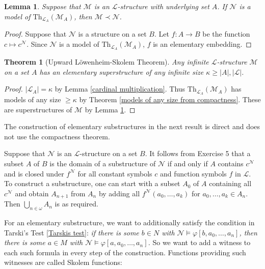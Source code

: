 \documentclass[a4paper, 11pt]{amsart}
\newtheorem{theorem}{Theorem}[subsection]
\newtheorem{lemma}[lemma]{Lemma}
\theoremstyle{remark}
\newcommand{\Th}{\mathrm{Th}}
\newcommand{\cL}{\mathcal L}
\newcommand{\cM}{\mathcal M}
\newcommand{\cN}{\mathcal N}
\begin{document}
\begin{lemma} 
\label{models of canonical theory of a structures} 
Suppose that $\cM$ is an $\cL$-structure with underlying set $A$. 
If $\cN$ is a model of $\Th_{\cL_A}(\cM_A)$, then $\cM\prec\cN$.  
\end{lemma} 
\begin{proof} 
Suppose that $\cN$ is a structure on a set $B$. 
Let $f\colon A\rightarrow B$ be the function $c\mapsto c^\cN$. 
Since $\cN$ is a model of $\Th_{\cL_A}(\cM_A)$, $f$ is an elementary embedding. 
\end{proof} 

\begin{theorem}[Upward L\"owenheim-Skolem Theorem] 
Any infinite $\cL$-structure $\cM$ on a set $A$ has an elementary superstructure of any infinite size $\kappa\geq |A|,|\cL|$. 
\end{theorem} 
\begin{proof} 
$|\cL_A|=\kappa$ by Lemma \ref{cardinal multiplication}. 
Thus $\Th_{\cL_A}(\cM_A)$ has models of any size $\geq \kappa$ by Theorem \ref{models of any size from compactness}. 
These are superstructures of $\cM$ by Lemma \ref{models of canonical theory of a structures}. 
\end{proof} 



The construction of elementary substructures in the next result is direct and does not use the compactness theorem. 

Suppose that $\cN$ is an $\cL$-structure on a set $B$. 
It follows from Exercise 5 that a subset $A$ of $B$ is the domain of a substructure of $\cN$ if and only if $A$ contains $c^\cN$ and is closed under $f^\cN$ for all constant symbols $c$ and function symbols $f$ in $\cL$. 
To construct a substructure, one can start with a subset $A_0$ of $A$ containing all $c^\cN$ and obtain $A_{n+1}$ from $A_n$ by adding all $f^\cN(a_0,\dots,a_k)$ for $a_0,\dots, a_k\in A_n$. Then $\bigcup_{n\in\omega} A_n$ is as required. 

For an elementary substructure, we want to additionally satisfy the condition in Tarski's Test \ref{Tarskis test}: 
\emph{if there is some $b\in N$ with $\cN\models \varphi[b,a_0,\dots,a_n]$, then there is some $a\in M$ with $\cN \models \varphi[a,a_0,\dots, a_n]$.} 
So we want to add a witness to each such formula in every step of the construction. 
Functions providing such witnesses are called Skolem functions: 
\end{document}
